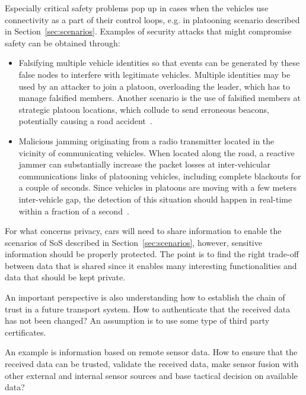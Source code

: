 Especially critical safety problems pop up in cases when the vehicles use connectivity as a part of their control loops, e.g. in platooning scenario described in Section~\ref{sec:scenarios}. Examples of security attacks that might compromise safety can be obtained through:
\begin{itemize}
    \item Falsifying multiple vehicle identities so that events can be generated by these false nodes to interfere with legitimate vehicles. Multiple identities may be used by an attacker to join a platoon, overloading the leader, which has to manage falsified members. Another scenario is the use of falsified members at strategic platoon locations, which collude to send erroneous beacons, potentially causing a road accident~\cite{Felipe}.
    \item Malicious jamming originating from a radio transmitter located in the vicinity of communicating vehicles. When located along the road, a reactive jammer can substantially increase the packet losses at inter-vehicular communications links of platooning vehicles, including complete blackouts for a couple of seconds. Since vehicles in platoons are moving with a few meters inter-vehicle gap, the detection of this situation should happen in real-time within a fraction of a second~\cite{Lyamin}.
\end{itemize}

For what concerns privacy, cars will need to share information
to enable the scenarios of SoS described in Section~\ref{sec:scenarios}, however, sensitive information should be properly
protected. %
The point is to find the right trade-off between data that is shared since it enables many interesting functionalities and data that should be kept private.

An important perspective is also understanding how to establish the chain of trust in a future transport system. How to authenticate that the received data has not been changed? An assumption is to use some type of third party certificates.

An example is information based on remote sensor data. How to ensure that the received data can be trusted, validate the received data, make sensor fusion with other external and internal sensor sources and base tactical decision on available data?

